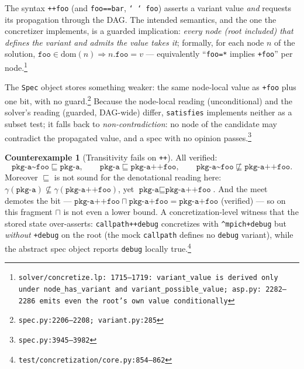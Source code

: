 \documentclass[11pt]{article}
\theoremstyle{definition}
\newtheorem{counterexample}[theorem]{Counterexample}
\theoremstyle{remark}
\newcommand{\sat}{\sqsubseteq}
\newcommand{\meet}{\sqcap}
\newcommand{\den}[1]{\gamma(#1)}
\newcommand{\code}[1]{\texttt{#1}}
\newcommand{\src}[1]{\footnote{\code{#1}}}
\begin{document}
The syntax \code{++foo} (and \code{foo==bar}, \code{\char`~\char`~foo})
asserts a variant value \emph{and} requests its propagation through the DAG.
The intended semantics, and the one the concretizer implements, is a guarded
implication: \emph{every node (root included) that defines the variant and
admits the value takes it}; formally, for each node $n$ of the solution,
$\code{foo} \in \mathrm{dom}(n) \Rightarrow n.\code{foo} = v$ --- equivalently
``\code{foo=*} implies \code{+foo}'' per node.\src{solver/concretize.lp:%
1715--1719: \code{variant\_value} is derived only under
\code{node\_has\_variant} and \code{variant\_possible\_value}; asp.py:%
2282--2286 emits even the root's own value conditionally}

The \code{Spec} object stores something weaker: the same node-local value as
\code{+foo} plus one bit, with no guard.\src{spec.py:2206--2208;
variant.py:285}  Because the node-local reading (unconditional) and the
solver's reading (guarded, DAG-wide) differ, \code{satisfies} implements
neither as a subset test; it falls back to \emph{non-contradiction}: no node
of the candidate may contradict the propagated value, and a spec with no
opinion passes.\src{spec.py:3945--3982}

\begin{counterexample}[Transitivity fails on \code{++}]\label{cex:prop}
All verified:
\[
\code{pkg-a\char`~foo} \sat \code{pkg-a}, \qquad
\code{pkg-a} \sat \code{pkg-a++foo}, \qquad
\code{pkg-a\char`~foo} \not\sat \code{pkg-a++foo}.
\]
Moreover $\sat$ is not sound for the denotational reading here:
$\den{\code{pkg-a}} \not\subseteq \den{\code{pkg-a++foo}}$, yet
$\code{pkg-a} \sat \code{pkg-a++foo}$.  And the meet demotes the bit ---
$\code{pkg-a++foo} \meet \code{pkg-a+foo} = \code{pkg-a+foo}$ (verified) ---
so on this fragment $\meet$ is not even a lower bound.  A concretization-level
witness that the stored state over-asserts: \code{callpath++debug}
concretizes with \code{\^{}mpich+debug} but \emph{without} \code{+debug} on
the root (the mock \code{callpath} defines no \code{debug} variant), while
the abstract spec object reports \code{debug} locally
true.\src{test/concretization/core.py:854--862}
\end{counterexample}
\end{document}
